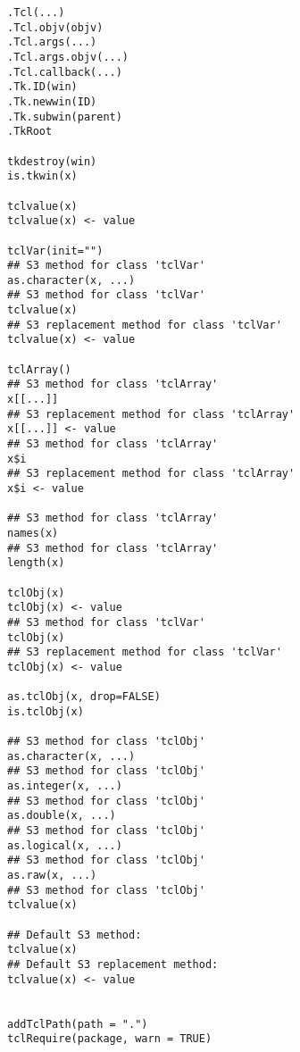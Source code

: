 \begin{Usage}
\begin{verbatim}
.Tcl(...)
.Tcl.objv(objv)
.Tcl.args(...)
.Tcl.args.objv(...)
.Tcl.callback(...)
.Tk.ID(win)
.Tk.newwin(ID)
.Tk.subwin(parent)
.TkRoot

tkdestroy(win)
is.tkwin(x)

tclvalue(x)
tclvalue(x) <- value

tclVar(init="")
## S3 method for class 'tclVar'
as.character(x, ...)
## S3 method for class 'tclVar'
tclvalue(x)
## S3 replacement method for class 'tclVar'
tclvalue(x) <- value

tclArray()
## S3 method for class 'tclArray'
x[[...]]
## S3 replacement method for class 'tclArray'
x[[...]] <- value
## S3 method for class 'tclArray'
x$i
## S3 replacement method for class 'tclArray'
x$i <- value

## S3 method for class 'tclArray'
names(x)
## S3 method for class 'tclArray'
length(x)

tclObj(x)
tclObj(x) <- value
## S3 method for class 'tclVar'
tclObj(x)
## S3 replacement method for class 'tclVar'
tclObj(x) <- value

as.tclObj(x, drop=FALSE)
is.tclObj(x)

## S3 method for class 'tclObj'
as.character(x, ...)
## S3 method for class 'tclObj'
as.integer(x, ...)
## S3 method for class 'tclObj'
as.double(x, ...)
## S3 method for class 'tclObj'
as.logical(x, ...)
## S3 method for class 'tclObj'
as.raw(x, ...)
## S3 method for class 'tclObj'
tclvalue(x)

## Default S3 method:
tclvalue(x)
## Default S3 replacement method:
tclvalue(x) <- value


addTclPath(path = ".")
tclRequire(package, warn = TRUE)
\end{verbatim}
\end{Usage}
%
